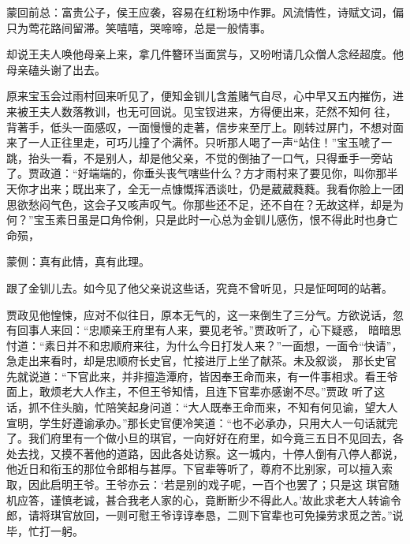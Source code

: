 

\begin{parag}
    \begin{note}蒙回前总：富贵公子，侯王应袭，容易在红粉场中作罪。风流情性，诗赋文词，偏只为莺花路间留滞。笑嘻嘻，哭啼啼，总是一般情事。\end{note}
\end{parag}


\begin{parag}
    却说王夫人唤他母亲上来，拿几件簪环当面赏与，又吩咐请几众僧人念经超度。他母亲磕头谢了出去。
\end{parag}


\begin{parag}
    原来宝玉会过雨村回来听见了，便知金钏儿含羞赌气自尽，心中早又五内摧伤，进来被王夫人数落教训，也无可回说。见宝钗进来，方得便出来，茫然不知何 往，背著手，低头一面感叹，一面慢慢的走著，信步来至厅上。刚转过屏门，不想对面来了一人正往里走，可巧儿撞了个满怀。只听那人喝了一声“站住！”宝玉唬了一跳，抬头一看，不是别人，却是他父亲，不觉的倒抽了一口气，只得垂手一旁站了。贾政道：“好端端的，你垂头丧气嗐些什么？方才雨村来了要见你，叫你那半天你才出来；既出来了，全无一点慷慨挥洒谈吐，仍是葳葳蕤蕤。我看你脸上一团思欲愁闷气色，这会子又咳声叹气。你那些还不足，还不自在？无故这样，却是为何？”宝玉素日虽是口角伶俐，只是此时一心总为金钏儿感伤，恨不得此时也身亡命殒，\begin{note}蒙侧：真有此情，真有此理。\end{note}跟了金钏儿去。如今见了他父亲说这些话，究竟不曾听见，只是怔呵呵的站著。
\end{parag}


\begin{parag}
    贾政见他惶悚，应对不似往日，原本无气的，这一来倒生了三分气。方欲说话，忽有回事人来回：“忠顺亲王府里有人来，要见老爷。”贾政听了，心下疑惑， 暗暗思忖道：“素日并不和忠顺府来往，为什么今日打发人来？”一面想，一面令“快请”，急走出来看时，却是忠顺府长史官，忙接进厅上坐了献茶。未及叙谈， 那长史官先就说道：“下官此来，并非擅造潭府，皆因奉王命而来，有一件事相求。看王爷面上，敢烦老大人作主，不但王爷知情，且连下官辈亦感谢不尽。”贾政 听了这话，抓不住头脑，忙陪笑起身问道：“大人既奉王命而来，不知有何见谕，望大人宣明，学生好遵谕承办。”那长史官便冷笑道：“也不必承办，只用大人一句话就完了。我们府里有一个做小旦的琪官，一向好好在府里，如今竟三五日不见回去，各处去找，又摸不著他的道路，因此各处访察。这一城内，十停人倒有八停人都说，他近日和衔玉的那位令郎相与甚厚。下官辈等听了，尊府不比别家，可以擅入索取，因此启明王爷。王爷亦云：‘若是别的戏子呢，一百个也罢了；只是这 琪官随机应答，谨慎老诚，甚合我老人家的心，竟断断少不得此人。’故此求老大人转谕令郎，请将琪官放回，一则可慰王爷谆谆奉恳，二则下官辈也可免操劳求觅之苦。”说毕，忙打一躬。
\end{parag}


